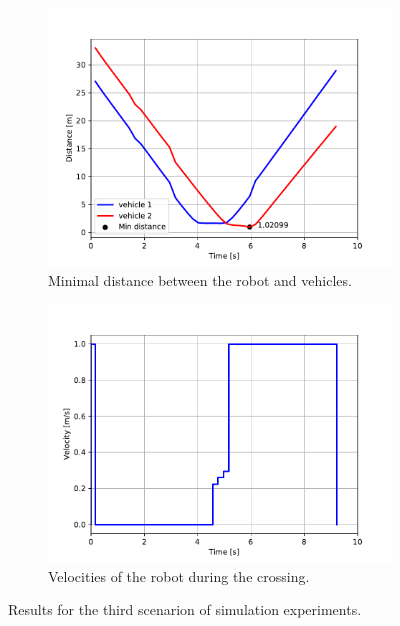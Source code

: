             \begin{figure}[ht]
                \centering
                \begin{subfigure}{0.49\linewidth}
                    \centering
                    \includegraphics[trim={24 8 40 41}, clip, width=\linewidth]{images/simulations/scene3_dist.pdf}
                    \caption{Minimal distance between the robot and vehicles.}
                \end{subfigure}
                \begin{subfigure}{0.49\linewidth}
                    \centering
                    \includegraphics[trim={21 8 40 41}, clip, width=\linewidth]{images/simulations/scene3_vel.pdf}
                    \caption{Velocities of the robot during the crossing.}
                \end{subfigure}
                \caption{Results for the third scenarion of simulation experiments.}
                \label{fig:scene3_graphs}
            \end{figure}
